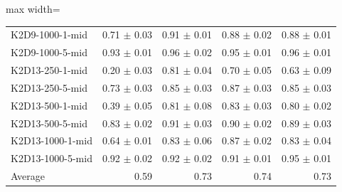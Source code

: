 \documentclass{article}
\begin{document}
\begin{table}[ht]
\begin{center}
\begin{small}
\begin{adjustbox}{max width=\columnwidth}
\begin{tabular}{l|rrrr}
K2D9-1000-1-mid & 0.71 $\pm$ 0.03 & 0.91 $\pm$ 0.01 & 0.88 $\pm$ 0.02 & 0.88 $\pm$ 0.01\\
K2D9-1000-5-mid & 0.93 $\pm$ 0.01 & 0.96 $\pm$ 0.02 & 0.95 $\pm$ 0.01 & 0.96 $\pm$ 0.01\\
K2D13-250-1-mid & 0.20 $\pm$ 0.03 & 0.81 $\pm$ 0.04 & 0.70 $\pm$ 0.05 & 0.63 $\pm$ 0.09\\
K2D13-250-5-mid & 0.73 $\pm$ 0.03 & 0.85 $\pm$ 0.03 & 0.87 $\pm$ 0.03 & 0.85 $\pm$ 0.03\\
K2D13-500-1-mid & 0.39 $\pm$ 0.05 & 0.81 $\pm$ 0.08 & 0.83 $\pm$ 0.03 & 0.80 $\pm$ 0.02\\
K2D13-500-5-mid & 0.83 $\pm$ 0.02 & 0.91 $\pm$ 0.03 & 0.90 $\pm$ 0.02 & 0.89 $\pm$ 0.03\\
K2D13-1000-1-mid & 0.64 $\pm$ 0.01 & 0.83 $\pm$ 0.06 & 0.87 $\pm$ 0.02 & 0.83 $\pm$ 0.04\\
K2D13-1000-5-mid & 0.92 $\pm$ 0.02 & 0.92 $\pm$ 0.02 & 0.91 $\pm$ 0.01 & 0.95 $\pm$ 0.01\\
\midrule
Average & 0.59 & 0.73 & 0.74 & 0.73\\
\end{tabular}
        \end{adjustbox}
    \end{small}
    \end{center}
    \vskip -0.1in
\end{table}
\end{document}
